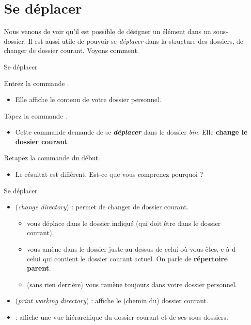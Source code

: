 \documentclass[a4paper,11pt]{style-esi/td}
\begin{document}
	\section{Se déplacer}

		Nous venons de voir qu'il est possible 
		de désigner un élément dans un sous-dossier.
		Il est aussi utile de pouvoir se \emph{déplacer} 
		dans la structure des dossiers, de changer de dossier courant.
		Voyons comment.

		\begin{Experience}{Se déplacer}  
			\vspace{-1em}
			\begin{steps}
			\item 
				Entrez la commande .
				\begin{itemize}
				\item 
					Elle affiche le contenu de votre dossier personnel.
				\end{itemize}
			\item 
				Tapez la commande .
				\begin{itemize}
				\item 
					Cette commande demande de se \textit{\textbf{déplacer}} 
					dans le dossier \textit{bin}.
					Elle \textbf{change le dossier courant}.
				\end{itemize}
			\item 
				Retapez la commande  du début.
				\begin{itemize}
				\item Le résultat est différent. 
					Est-ce que vous comprenez pourquoi ?
				\end{itemize}
			\end{steps}
		\end{Experience}
		
		\bigskip
		\begin{theorie}{Se déplacer}
			\begin{itemize}
			\item {} (\emph{change directory}) : permet de changer de dossier courant.
				\begin{itemize}
				\item {}
					vous déplace dans le dossier indiqué (qui doit être dans le dossier courant).
				\item {}
					vous amène dans le dossier juste au-dessus de celui où vous êtes, 
					c-à-d celui qui contient le dossier courant actuel.
					On parle de \textbf{répertoire parent}.
				\item {}
					(sans rien derrière) vous ramène toujours dans votre dossier personnel.
				\end{itemize}
			\item {} (\textit{print working directory})  :
				affiche le (chemin du) dossier courant.
			\item {} :
				affiche une vue hiérarchique du dossier courant et de ses sous-dossiers.
			\end{itemize}
		\end{theorie}
		
\end{document}
